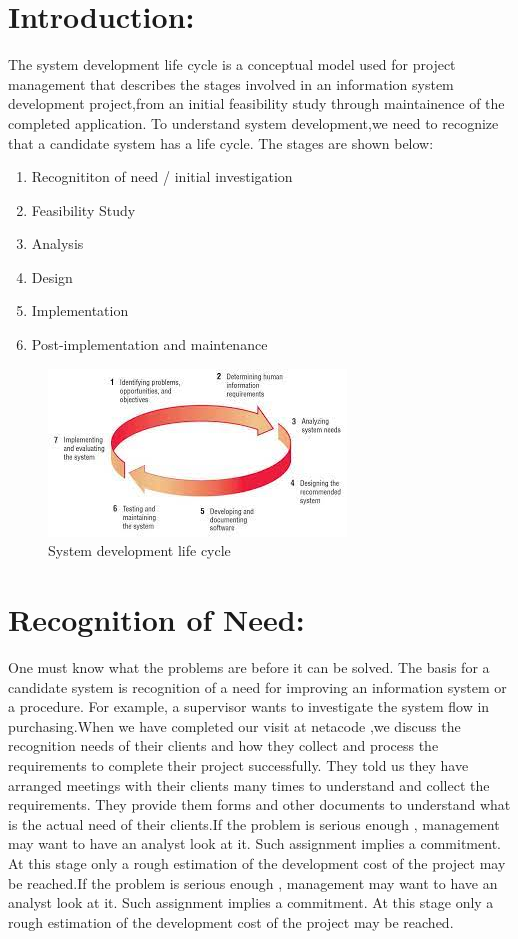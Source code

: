 \documentclass[a4paper,12pt]{report}
\begin{document}
\section{Introduction:}
The system development life cycle is a conceptual model used for project management that describes the stages involved in an information system development project,from an initial feasibility study through maintainence of the completed application. To understand system development,we need to recognize that a candidate system has a life cycle. The stages are shown below:
\begin{enumerate}
	\item Recognititon of need / initial investigation
	\item	Feasibility Study
	\item	Analysis
	\item Design
	\item	Implementation
	\item	Post-implementation and maintenance   
	\end{enumerate}
\begin{figure}[h]
	\centering
	\includegraphics[width=0.7\linewidth]{fig-1;chap-2}
	\caption{System development life cycle}
	\label{fig:fig-1chap-2}
\end{figure}
\section{Recognition of Need: }
One must know what the problems are before it can be solved. The basis for a candidate system is recognition of a need for improving an information system or a procedure. For example, a supervisor wants to investigate the system flow in purchasing.When we have completed our visit at netacode ,we discuss the recognition needs of their clients and how they collect and process the requirements to complete their project  successfully. They told us they have arranged meetings with their clients many times to understand and collect the requirements. They provide them forms and other documents to understand what is the actual need of their clients.If the problem is serious enough , management may want to have an analyst look at it. Such assignment  implies a commitment. At this stage only a rough estimation of the development cost of the project may be reached.If the problem is serious enough , management may want to have an analyst look at it. Such assignment  implies a commitment. At this stage only a rough estimation of the development cost of the project may be reached.
\end{document}
